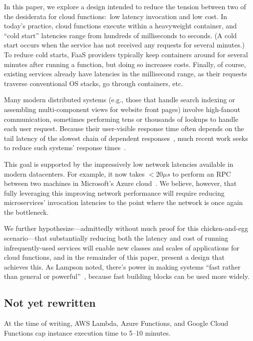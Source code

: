 In this paper, we explore a design intended to reduce the tension between two of
the desiderata for cloud functions:\ low latency invocation and low cost.  In
today's practice, cloud functions execute within a heavyweight container, and
``cold start'' latencies range from hundreds of milliseconds to seconds.  (A
cold start occurs when the service has not received any requests for several
minutes.)  To reduce cold starts, FaaS providers typically keep containers
around for several minutes after running a function, but doing so increases
costs.  Finally, of course, existing services already have latencies in the
millisecond range, as their requests traverse conventional OS stacks, go through
containers, etc.

Many modern distributed systems (e.g., those that handle search indexing or
assembling multi-component views for website front pages) involve
high-fanout communication, sometimes performing tens or thousands of
lookups to handle each user request.  Because their user-visible response time often
depends on the tail latency of the slowest chain of dependent
responses~\cite{Dean:cacm2013}, much recent work seeks to reduce
such systems' response
times~\cite{Jalaparti:sigcomm2013,Xu:nsdi2013,Li:socc2014,Jeon:asplos2016}.

This goal is supported by the impressively low network latencies available in
modern datacenters.  For example, it
now takes $<20\mu{}s$ to perform an RPC between two machines in Microsoft's Azure
cloud~\cite{www-firestone-azure-latency}.  We believe, however, that fully leveraging
this improving network performance will require reducing microservices' invocation
latencies to the point where the network is once again the bottleneck.

We further hypothesize---admittedly without much proof for this chicken-and-egg
scenario---that substantially reducing both the latency and cost of running
infrequently-used services will enable new classes and scales of applications
for cloud functions, and in the remainder of this paper, present a design that
achieves this.  As Lampson noted, there's power in making systems 
``fast rather than general or powerful''~\cite{Lampson1983}, because fast
building blocks can be used more widely.

\subsection{Not yet rewritten}

At the time of writing, AWS Lambda, Azure Functions, and Google Cloud Functions
cap instance execution time to 5--10 minutes.

